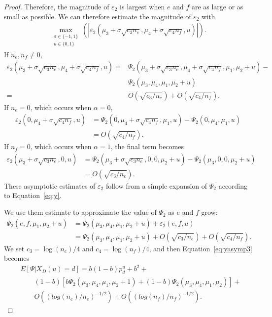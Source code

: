 \documentclass[prodmode,acmtissec]{acmsmall}
\begin{document}
\begin{proof}
Therefore, the magnitude of $\varepsilon_2$ is largest when $e$ and $f$ are as large or as small as possible.  We can therefore estimate the magnitude of $\varepsilon_2$ with
\begin{align*}
\max_{ \substack{\sigma\in\{-1,1\}\\ u\in \{0,1\} }} \left( \left| \varepsilon_2 \left(\mu_3+\sigma\sqrt{c_3 n_e},\mu_4+\sigma\sqrt{c_4 n_f},u \right) \right| \right).
\end{align*}
If $n_e, n_f \neq 0$,
\begin{align*}
\varepsilon_2 \left(\mu_3+\sigma\sqrt{c_3 n_e},\mu_4+\sigma\sqrt{c_4 n_f},u \right) = &\Psi_2(\mu_3+\sigma\sqrt{c_3 n_e},\mu_4+\sigma\sqrt{c_4 n_f},\mu_1,\mu_2+u) - \\
&\Psi_2(\mu_3,\mu_4,\mu_1,\mu_2+u)\\
= &O\left( \sqrt{c_3/n_e} \right) + O\left( \sqrt{c_4/n_f} \right) .
\end{align*}
If $n_e = 0$, which occurs when $\alpha = 0$,
\begin{align*}
\varepsilon_2 \left(0,\mu_4+\sigma\sqrt{c_4 n_f},u \right) &= \Psi_2(0,\mu_4+\sigma\sqrt{c_4 n_f},\mu_1,u) - \Psi_2(0,\mu_4,\mu_1,u)\\
&= O\left( \sqrt{c_4/n_f} \right).
\end{align*}
If $n_f = 0$, which occurs when $\alpha = 1$, the final term becomes
\begin{align*}
\varepsilon_2 \left(\mu_3+\sigma\sqrt{c_3 n_e},0,u \right) &= \Psi_2(\mu_3+\sigma\sqrt{c_3 n_e},0,0,\mu_2+u) - \Psi_2(\mu_3,0,0,\mu_2+u)\\
&= O\left( \sqrt{c_3/n_e} \right).
\end{align*}
These asymptotic estimates of $\varepsilon_2$ follow from a simple expansion of $\Psi_2$ according to Equation~\ref{eq:y}.

We use them estimate to approximate the value of $\Psi_2$ as $e$ and $f$ grow:
\begin{align*}
\Psi_2(e,f,\mu_1,\mu_2+u) &= \Psi_2(\mu_3,\mu_4,\mu_1,\mu_2+u) + \varepsilon_2(e,f,u)\\
&= \Psi_2(\mu_3,\mu_4,\mu_1,\mu_2+u) + O\left( \sqrt{c_3/n_e} \right) + O\left( \sqrt{c_4/n_f} \right).
\end{align*}
We set $c_3 = \log(n_e)/4$ and $c_4 = \log(n_f)/4$, and then Equation~\ref{eq:yasymp3} becomes
\begin{equation} \label{eq:yasymp4}
\begin{split}
&E[\Psi | X_D(u)=d] = b(1-b)p^u_d + b^2 + \\
&\qquad (1-b) \left[ b \Psi_2(\mu_3,\mu_4,\mu_1,\mu_2+1) + (1-b) \Psi_2(\mu_3,\mu_4,\mu_1,\mu_2) \right] + \\
&\qquad O\left( \left( log(n_e)/n_e \right)^{-1/2} \right) + O\left( \left( log(n_f)/n_f \right)^{-1/2} \right).
\end{split}
\end{equation}


\end{proof}
\end{document}
